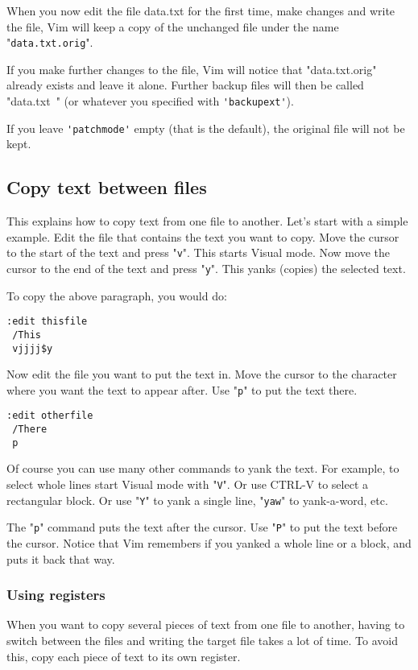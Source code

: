 When you now edit the file data.txt for the first time, make changes and write the file, Vim will keep a copy of the unchanged file under the name "\verb!data.txt.orig!".

If you make further changes to the file, Vim will notice that "data.txt.orig" already exists and leave it alone.
Further backup files will then be called "data.txt~" (or whatever you specified with \verb!'backupext'!).

If you leave \verb!'patchmode'! empty (that is the default), the original file will not be kept.

\subsection{Copy text between files}
This explains how to copy text from one file to another.
Let's start with a simple example.
Edit the file that contains the text you want to copy.
Move the cursor to the start of the text and press "\verb!v!".
This starts Visual mode.
Now move the cursor to the end of the text and press "\verb!y!".
This yanks (copies) the selected text.

To copy the above paragraph, you would do:

 \begin{Verbatim}[samepage=true]
 :edit thisfile
 /This
 vjjjj$y
 \end{Verbatim}

Now edit the file you want to put the text in.
Move the cursor to the character where you want the text to appear after.
Use "\verb!p!" to put the text there.

 \begin{Verbatim}[samepage=true]
 :edit otherfile
 /There
 p
 \end{Verbatim}

Of course you can use many other commands to yank the text.
For example, to select whole lines start Visual mode with "\verb!V!".
Or use CTRL-V to select a rectangular block.
Or use "\verb!Y!" to yank a single line, "\verb!yaw!" to yank-a-word, etc.

The "\verb!p!" command puts the text after the cursor.
Use "\verb!P!" to put the text before the cursor.
Notice that Vim remembers if you yanked a whole line or a block, and puts it back that way.

\subsubsection{Using registers}
When you want to copy several pieces of text from one file to another, having to switch between the files and writing the target file takes a lot of time.
To avoid this, copy each piece of text to its own register.

